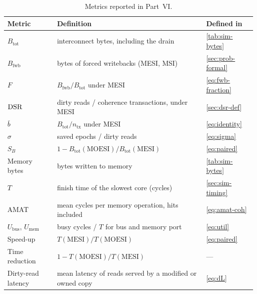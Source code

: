 \begin{table}[htbp]
\centering
\caption{Metrics reported in Part~VI.}
\label{tab:metrics}
\small
\begin{tabular}{@{}L{2.4cm} L{6.4cm} L{3.8cm}@{}}
\toprule
Metric & Definition & Defined in \\
\midrule
$B_{\mathrm{tot}}$ & interconnect bytes, including the drain & \cref{tab:sim-bytes} \\
$B_{\mathrm{fwb}}$ & bytes of forced writebacks (MESI, MSI) & \cref{sec:prob-formal} \\
$F$ & $B_{\mathrm{fwb}}/B_{\mathrm{tot}}$ under MESI & \cref{eq:fwb-fraction} \\
$\mathrm{DSR}$ & dirty reads / coherence transactions, under MESI & \cref{sec:dsr-def} \\
$\bar b$ & $B_{\mathrm{tot}}/n_{\mathrm{tx}}$ under MESI & \cref{eq:identity} \\
$\sigma$ & saved epochs / dirty reads & \cref{eq:sigma} \\
$S_B$ & $1 - B_{\mathrm{tot}}(\mathrm{MOESI})/B_{\mathrm{tot}}(\mathrm{MESI})$ & \cref{eq:paired} \\
Memory bytes & bytes written to memory & \cref{tab:sim-bytes} \\
\midrule
$T$ & finish time of the slowest core (cycles) & \cref{sec:sim-timing} \\
AMAT & mean cycles per memory operation, hits included & \cref{eq:amat-coh} \\
$U_{\mathrm{bus}}$, $U_{\mathrm{mem}}$ & busy cycles / $T$ for bus and memory port & \cref{eq:util} \\
Speed-up & $T(\mathrm{MESI})/T(\mathrm{MOESI})$ & \cref{eq:paired} \\
Time reduction & $1 - T(\mathrm{MOESI})/T(\mathrm{MESI})$ & --- \\
Dirty-read latency & mean latency of reads served by a modified or owned copy & \cref{eq:dL} \\
\bottomrule
\end{tabular}
\end{table}
